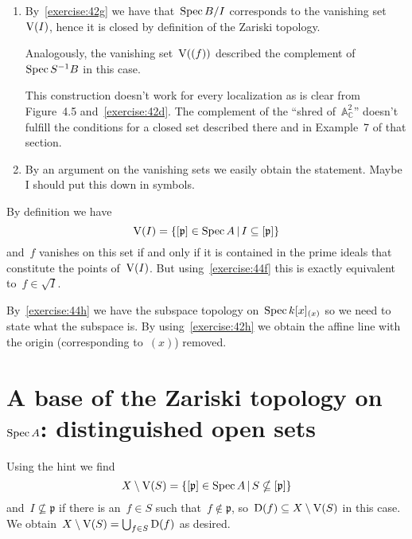 \begin{exercise} %
  \label{exercise:44h}
  \begin{enumerate}
    \item By~\autoref{exercise:42g} we have that~$\operatorname{Spec} B/I$ corresponds to the vanishing set~$\operatorname{V}(I)$, hence it is closed by definition of the Zariski topology.

      Analogously, the vanishing set~$\operatorname{V}((f))$ described the complement of~$\operatorname{Spec} S^{-1}B$ in this case.

      This construction doesn't work for every localization as is clear from Figure~4.5 and~\autoref{exercise:42d}. The complement of the ``shred of~$\mathbb{A}_{\mathbb{C}}^2$'' doesn't fulfill the conditions for a closed set described there and in Example~7 of that section.

    \item By an argument on the vanishing sets we easily obtain the statement. Maybe I should put this down in symbols.
  \end{enumerate}
\end{exercise}

\begin{exercise}
  \label{exercise:44i}
  By definition we have
  \begin{equation}
    \operatorname{V}(I)=\left\{ [\mathfrak{p}]\in\operatorname{Spec} A\,|\,I\subseteq[\mathfrak{p}] \right\}
  \end{equation}
  and~$f$ vanishes on this set if and only if it is contained in the prime ideals that constitute the points of~$\operatorname{V}(I)$. But using~\autoref{exercise:44f} this is exactly equivalent to~$f\in\sqrt{I}$.
\end{exercise}

\begin{exercise}
  By~\autoref{exercise:44h} we have the subspace topology on~$\operatorname{Spec} k[x]_{(x)}$ so we need to state what the subspace is. By using~\autoref{exercise:42h} we obtain the affine line with the origin (corresponding to~$(x)$) removed.
\end{exercise}


\section{A base of the Zariski topology on \texorpdfstring{$\operatorname{Spec} A$}{Spec A}: distinguished open sets}

\begin{exercise}
  \label{exercise:45a}
  Using the hint we find
  \begin{equation}
    X\setminus\operatorname{V}(S)=\left\{ [\mathfrak{p}]\in\operatorname{Spec} A\,|\,S\nsubseteq[\mathfrak{p}] \right\}
  \end{equation}
  and~$I\nsubseteq\mathfrak{p}$ if there is an~$f\in S$ such that~$f\notin\mathfrak{p}$, so~$\operatorname{D}(f)\subseteq X\setminus\operatorname{V}(S)$ in this case. We obtain~$X\setminus\operatorname{V}(S)=\bigcup_{f\in S}\operatorname{D}(f)$ as desired.
\end{exercise}

